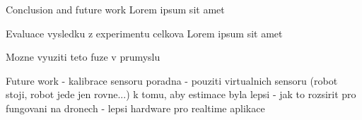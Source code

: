 \chap Conclusion and future work
Lorem ipsum sit amet

\sec Evaluace vysledku z experimentu celkova
Lorem ipsum sit amet

\sec Mozne vyuziti teto fuze v prumyslu


\sec Future work
 - kalibrace sensoru poradna
 - pouziti virtualnich sensoru (robot stoji, robot jede jen rovne...) k tomu, aby estimace byla lepsi
 - jak to rozsirit pro fungovani na dronech
 - lepsi hardware pro realtime aplikace